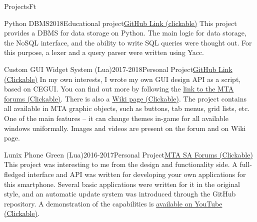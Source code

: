 \documentclass[10pt]{extarticle}
\begin{document}
\begin{centralpart}{Projects}{F}{t}
		\begin{titleblock}{Python DBMS}{2018}{Educational project}{\href{https://github.com/AriosJentu/PyDBMS}{GitHub Link (clickable)}}
			\hspace{15pt} This project provides a DBMS for data storage on Python. The main logic for data storage, the NoSQL interface, and the ability to write SQL queries were thought out. For this purpose, a lexer and a query parser were written using Yacc. 
		\end{titleblock}

		\begin{titleblock}{Custom GUI Widget System (Lua)}{2017-2018}{Personal Project}{\href{https://github.com/AriosJentu/LuaWinSys}{GitHub Link (Clickable)}}
			\hspace{15pt} In my own interests, I wrote my own GUI design API as a script, based on CEGUI. You can find out more by following the {\color{sidetopsep}\href{https://forum.multitheftauto.com/topic/103782-rel-custom-gui-widget-system/}{link to the MTA forums (Clickable)}}. There is also a {\color{sidetopsep}\href{https://wiki.multitheftauto.com/wiki/Resource:CustomWidgets}{Wiki page (Clickable)}}. The project contains all available in MTA graphic objects, such as buttons, tab menus, grid lists, etc. One of the main features -- it can change themes in-game for all available windows uniformally. Images and videos are present on the forum and on Wiki page.
		\end{titleblock}

		\begin{titleblock}{Lunix Phone Green (Lua)}{2016-2017}{Personal Project}{\href{https://forum.multitheftauto.com/topic/98121-rel-lunix-phone-green-smartphone/}{MTA SA Forums (Clickable)}}
			\hspace{15pt} This project was interesting to me from the design and functionality side. A full-fledged interface and API was written for developing your own applications for this smartphone. Several basic applications were written for it in the original style, and an automatic update system was introduced through the GitHub repository. A demonstration of the capabilities is {\color{sidetopsep}\href{https://www.youtube.com/watch?v=4JuOIe_UCJY&ab_channel=AriosJentu}{available on YouTube (Clickable)}}.
		\end{titleblock}

	\end{centralpart}

	\BottomSignature
	\NewPage
	\DrawSimpleSideBar
\end{document}
